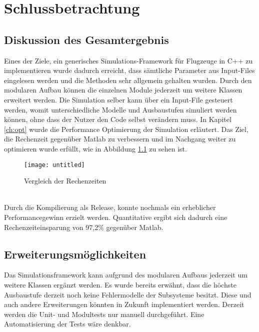 \chapter{Schlussbetrachtung}
\section{Diskussion des Gesamtergebnis}
Eines der Ziele, ein generisches Simulations-Framework für Flugzeuge in C++ zu implementieren wurde dadurch erreicht, dass sämtliche Parameter aus Input-Files eingelesen werden und die Methoden sehr allgemein gehalten wurden. Durch den modularen Aufbau können die einzelnen Module jederzeit um weitere Klassen erweitert werden. Die Simulation selber kann über ein Input-File gesteuert werden, womit unterschiedliche Modelle und Ausbaustufen simuliert werden können, ohne dass der Nutzer den Code selbst verändern muss. In Kapitel \ref{ch:opt} wurde die Performance Optimierung der Simulation erläutert. Das Ziel, die Rechenzeit gegenüber Matlab  zu verbessern und im Nachgang weiter zu optimieren wurde erfüllt, wie in Abbildung \ref{fig:optergeb} zu sehen ist. 
\begin{figure}[h]
	\centering
	\texttt{[image: untitled]}
	\caption{Vergleich der Rechenzeiten}
	\label{fig:optergeb}
\end{figure}\noindent\\
Durch die Kompilierung als Release, konnte nochmals ein erheblicher Performancegewinn erzielt werden. Quantitative ergibt sich dadurch eine Rechenzeiteinsparung von 97,2\% gegenüber Matlab.
\section{Erweiterungsmöglichkeiten}
Das Simulationsframework kann aufgrund des modularen Aufbaus jederzeit um weitere Klassen ergänzt werden. Es wurde bereits erwähnt, dass die höchste Ausbaustufe derzeit noch keine Fehlermodelle der Subsysteme besitzt. Diese und auch andere Erweiterungen könnten in Zukunft implementiert werden. Derzeit werden die Unit- und Modultests nur manuell durchgeführt. Eine Automatisierung der Tests wäre denkbar. 
